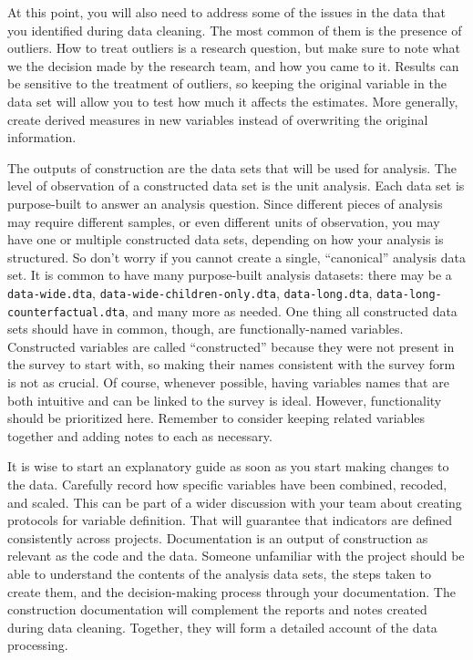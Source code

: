 At this point, you will also need to address some of the issues in the data that you identified during data cleaning. 
The most common of them is the presence of outliers.
How to treat outliers is a research question, but make sure to note what we the decision made by the research team, and how you came to it. 
Results can be sensitive to the treatment of outliers, so keeping the original variable in the data set will allow you to test how much it affects the estimates.
More generally, create derived measures in new variables instead of overwriting the original information.


The outputs of construction are the data sets that will be used for analysis.
The level of observation of a constructed data set is the unit analysis. 
Each data set is purpose-built to answer an analysis question.
Since different pieces of analysis may require different samples,
or even different units of observation,
you may have one or multiple constructed data sets, 
depending on how your analysis is structured.
So don't worry if you cannot create a single, ``canonical'' analysis data set.
It is common to have many purpose-built analysis datasets:
there may be a \texttt{data-wide.dta},
\texttt{data-wide-children-only.dta}, \texttt{data-long.dta},
\texttt{data-long-counterfactual.dta}, and many more as needed.
One thing all constructed data sets should have in common, though, are functionally-named variables.
Constructed variables are called ``constructed'' because they were not present in the survey to start with,
so making their names consistent with the survey form is not as crucial.
Of course, whenever possible, having variables names that are both intuitive and can be linked to the survey is ideal.
However, functionality should be prioritized here.
Remember to consider keeping related variables together and adding notes to each as necessary.

It is wise to start an explanatory guide as soon as you start making changes to the data.
Carefully record how specific variables have been combined, recoded, and scaled. 
This can be part of a wider discussion with your team about creating protocols for variable definition.
That will guarantee that indicators are defined consistently across projects.
Documentation is an output of construction as relevant as the code and the data.
Someone unfamiliar with the project should be able to understand the contents of the analysis data sets, the steps taken to create them, and the decision-making process through your documentation.
The construction documentation will complement the reports and notes created during data cleaning.
Together, they will form a detailed account of the data processing.




